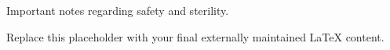 Important notes regarding safety and sterility.

Replace this placeholder with your final externally maintained LaTeX content.

